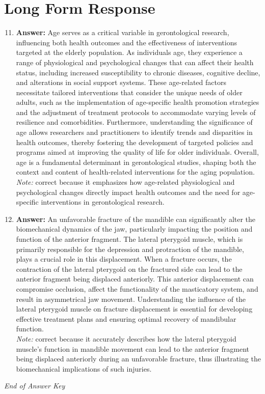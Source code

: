\documentclass[12pt]{article}
\begin{document}
\section*{Long Form Response}
\begin{enumerate}[label=\arabic*.]
\setcounter{enumi}{10}
\item \textbf{Answer:} Age serves as a critical variable in gerontological research, influencing both health outcomes and the effectiveness of interventions targeted at the elderly population. As individuals age, they experience a range of physiological and psychological changes that can affect their health status, including increased susceptibility to chronic diseases, cognitive decline, and alterations in social support systems. These age-related factors necessitate tailored interventions that consider the unique needs of older adults, such as the implementation of age-specific health promotion strategies and the adjustment of treatment protocols to accommodate varying levels of resilience and comorbidities. Furthermore, understanding the significance of age allows researchers and practitioners to identify trends and disparities in health outcomes, thereby fostering the development of targeted policies and programs aimed at improving the quality of life for older individuals. Overall, age is a fundamental determinant in gerontological studies, shaping both the context and content of health-related interventions for the aging population.
\\ \textit{Note:} correct because it emphasizes how age-related physiological and psychological changes directly impact health outcomes and the need for age-specific interventions in gerontological research.
\item \textbf{Answer:} An unfavorable fracture of the mandible can significantly alter the biomechanical dynamics of the jaw, particularly impacting the position and function of the anterior fragment. The lateral pterygoid muscle, which is primarily responsible for the depression and protraction of the mandible, plays a crucial role in this displacement. When a fracture occurs, the contraction of the lateral pterygoid on the fractured side can lead to the anterior fragment being displaced anteriorly. This anterior displacement can compromise occlusion, affect the functionality of the masticatory system, and result in asymmetrical jaw movement. Understanding the influence of the lateral pterygoid muscle on fracture displacement is essential for developing effective treatment plans and ensuring optimal recovery of mandibular function.
\\ \textit{Note:} correct because it accurately describes how the lateral pterygoid muscle's function in mandible movement can lead to the anterior fragment being displaced anteriorly during an unfavorable fracture, thus illustrating the biomechanical implications of such injuries.
\end{enumerate}

\vfill
\noindent\textit{End of Answer Key}
\end{document}
